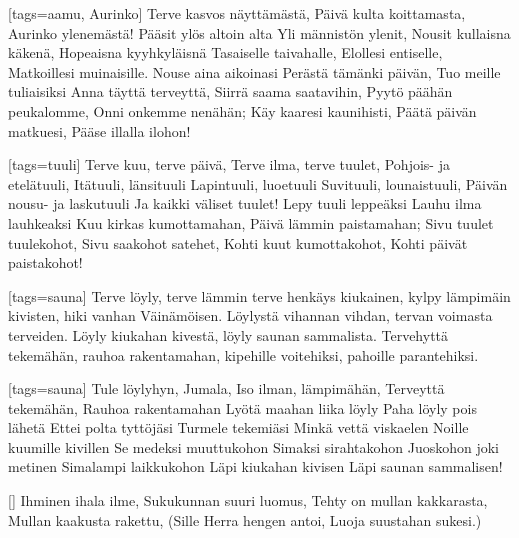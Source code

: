 [tags={aamu, Aurinko}]
  \beginverse
    Terve kasvos näyttämästä,
    Päivä kulta koittamasta,
    Aurinko ylenemästä!
    Pääsit ylös altoin alta
    Yli männistön ylenit,
    Nousit kullaisna käkenä,
    Hopeaisna kyyhkyläisnä
    Tasaiselle taivahalle,
    Elollesi entiselle,
    Matkoillesi muinaisille.
  \endverse
  \beginverse
    Nouse aina aikoinasi
    Perästä tämänki päivän,
    Tuo meille tuliaisiksi
    Anna täyttä terveyttä,
    Siirrä saama saatavihin,
    Pyytö päähän peukalomme,
    Onni onkemme nenähän;
    Käy kaaresi kaunihisti,
    Päätä päivän matkuesi,
    Pääse illalla ilohon!
  \endverse
\endsong


[tags={tuuli}]
  \beginverse
    Terve kuu, terve päivä,
    Terve ilma, terve tuulet,
    Pohjois- ja etelätuuli,
    Itätuuli, länsituuli
    Lapintuuli, luoetuuli
    Suvituuli, lounaistuuli,
    Päivän nousu- ja laskutuuli
    Ja kaikki väliset tuulet!
    Lepy tuuli leppeäksi
    Lauhu ilma lauhkeaksi
    Kuu kirkas kumottamahan,
    Päivä lämmin paistamahan;
    Sivu tuulet tuulekohot,
    Sivu saakohot satehet,
    Kohti kuut kumottakohot,
    Kohti päivät paistakohot!
  \endverse
\endsong


[tags={sauna}]
  \beginverse
    Terve löyly, terve lämmin
    terve henkäys kiukainen,
    kylpy lämpimäin kivisten,
    hiki vanhan Väinämöisen.
    Löylystä vihannan vihdan,
    tervan voimasta terveiden.
  \endverse
  \beginverse
    Löyly kiukahan kivestä,
    löyly saunan sammalista.
    Tervehyttä tekemähän,
    rauhoa rakentamahan,
    kipehille voitehiksi,
    pahoille parantehiksi.
  \endverse
\endsong


[tags={sauna}]
  \beginverse
    Tule löylyhyn, Jumala,
    Iso ilman, lämpimähän,
    Terveyttä tekemähän,
    Rauhoa rakentamahan
  \endverse
  \beginverse
    Lyötä maahan liika löyly
    Paha löyly pois lähetä
    Ettei polta tyttöjäsi
    Turmele tekemiäsi
  \endverse
  \beginverse
    Minkä vettä viskaelen
    Noille kuumille kivillen
    Se medeksi muuttukohon
    Simaksi sirahtakohon
  \endverse
  \beginverse
    Juoskohon joki metinen
    Simalampi laikkukohon
    Läpi kiukahan kivisen
    Läpi saunan sammalisen!
  \endverse
\endsong


[]
  \beginverse
    Ihminen ihala ilme,
    Sukukunnan suuri luomus,
    Tehty on mullan kakkarasta,
    Mullan kaakusta rakettu,
    (Sille Herra hengen antoi,
    Luoja suustahan sukesi.)
  \endverse
\endsong


